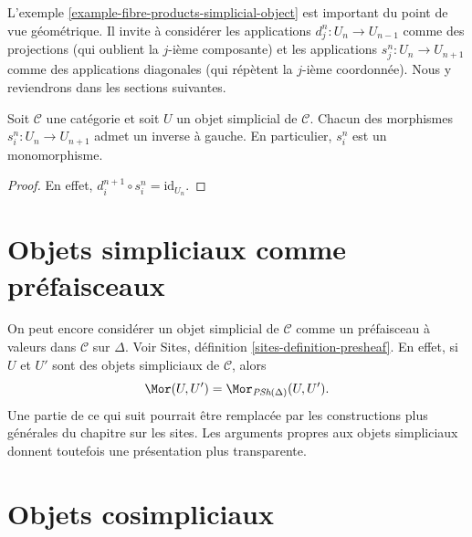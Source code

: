 \noindent
L'exemple \ref{example-fibre-products-simplicial-object} est important
du point de vue géométrique. Il invite à considérer les applications
$d^n_j : U_n \to U_{n - 1}$ comme des projections (qui oublient la
$j$-ième composante) et les applications $s^n_j : U_n \to U_{n + 1}$
comme des applications diagonales (qui répètent la $j$-ième coordonnée).
Nous y reviendrons dans les sections suivantes.

\begin{lemma}
\label{lemma-si-injective}
Soit $\mathcal{C}$ une catégorie et soit $U$ un objet simplicial de
$\mathcal{C}$. Chacun des morphismes $s^n_i : U_n \to U_{n + 1}$
admet un inverse à gauche. En particulier, $s^n_i$ est un monomorphisme.
\end{lemma}

\begin{proof}
En effet, $d_i^{n + 1} \circ s^n_i = \text{id}_{U_n}$.
\end{proof}

\section{Objets simpliciaux comme préfaisceaux}
\label{section-simplicial-presheaves}

\noindent
On peut encore considérer un objet simplicial de $\mathcal{C}$ comme un
préfaisceau à valeurs dans $\mathcal{C}$ sur $\Delta$. Voir
Sites, définition \ref{sites-definition-presheaf}.
En effet, si $U$ et $U'$ sont des objets simpliciaux de $\mathcal{C}$,
alors
\begin{equation}
\label{equation-simplicial-set-presheaf}
\Mor(U, U') = \Mor_{\textit{PSh}(\Delta)}(U, U').
\end{equation}
Une partie de ce qui suit pourrait être remplacée par les constructions
plus générales du chapitre sur les sites. Les arguments propres aux objets
simpliciaux donnent toutefois une présentation plus transparente.
















\section{Objets cosimpliciaux}
\label{section-cosimplicial-object}

